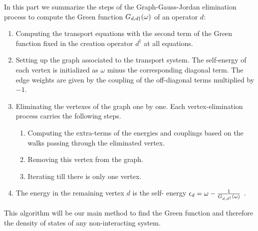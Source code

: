 In this part we summarize the steps of the Graph-Gauss-Jordan elimination process to compute the Green function  $G_{d,d\dagger}(\omega)$ of an operator $d$:
\begin{enumerate}
    \item Computing the transport equations with the second term of the Green function fixed in the creation operator $d^\dagger$ at all equations. 
     \item  Setting up the  graph associated to the transport system. The self-energy of each vertex is initialized as $\omega$ minus the corresponding diagonal term.  The edge weights are given by the coupling of the off-diagonal terms multiplied by $-1$. 
    \item Eliminating the vertexes of the graph one by one. Each vertex-elimination process carries the following steps.
    \begin{enumerate}
        \item Computing the extra-terms of the energies and couplings based on the walks passing through the eliminated vertex.
        \item Removing this vertex from the graph. 
        \item Iterating till there is only one  vertex.
        \end{enumerate}
    \item The energy in the remaining vertex $d$ is the self- energy $\epsilon_d = \omega -\frac{1}{ G_{d,d^\dagger}(\omega)}$ .
\end{enumerate}
This algorithm will be our main method to find the Green function and therefore the density of states of any non-interacting system.  









